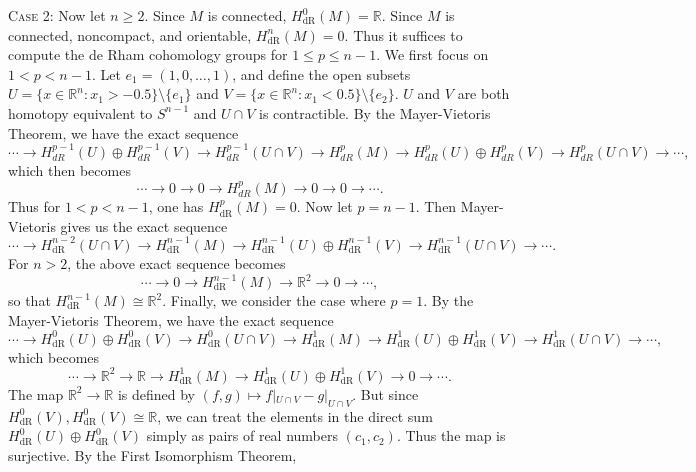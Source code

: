 \documentclass{article}
\begin{document}
	\textsc{Case 2:} Now let $n \geq 2$. Since $M$ is connected, $H^{0}_{\text{dR}}(M) = \mathbb{R}$. Since $M$ is connected, noncompact, and orientable, $H^{n}_{\text{dR}}(M) = 0$. Thus it suffices to compute the de Rham cohomology groups for $1 \leq p \leq n - 1$. We first focus on $1 < p < n - 1$. Let $e_{1} = (1,0, \ldots, 1)$, and define the open subsets $U = \{x \in \mathbb{R}^{n}: x_{1} > -0.5\} \setminus \{e_{1}\}$ and $V = \{x \in \mathbb{R}^{n}: x_{1} < 0.5\} \setminus \{e_{2}\}$. $U$ and $V$ are both homotopy equivalent to $S^{n-1}$ and $U \cap V$ is contractible. By the Mayer-Vietoris Theorem, we have the exact sequence 
	\begin{equation*}
		\dotsm \to H^{p-1}_{dR}(U) \oplus H^{p - 1}_{dR}(V) \to H^{p-1}_{dR}(U \cap V) \to H^{p}_{dR}(M) \to H^{p}_{dR}(U) \oplus H^{p}_{dR}(V) \to H^{p}_{dR}(U \cap V) \to \dotsm, 
	\end{equation*}
	which then becomes 
	\begin{equation*}
		\dotsm \to 0 \to 0 \to H^{p}_{dR}(M) \to 0 \to 0 \to \dotsm. 
	\end{equation*}
	Thus for $1 < p < n -1$, one has $H^{p}_{\text{dR}}(M) = 0$. Now let $p = n - 1$. Then Mayer-Vietoris gives us the exact sequence 
	\begin{equation*}
		\dotsm \to H^{n-2}_{\text{dR}}(U \cap V) \to H^{n-1}_{\text{dR}}(M) \to H^{n-1}_{\text{dR}}(U) \oplus H^{n-1}_{\text{dR}}(V) \to H^{n-1}_{\text{dR}}(U \cap V) \to \dotsm.  
	\end{equation*}
	For $n > 2$, the above exact sequence becomes 
	\begin{equation*}
		\dotsm \to 0 \to H^{n-1}_{\text{dR}}(M) \to\mathbb{R}^{2} \to 0 \to \dotsm, 
	\end{equation*}
	so that $H^{n-1}_{\text{dR}}(M) \cong \mathbb{R}^{2}$. Finally, we consider the case where $p = 1$. By the Mayer-Vietoris Theorem, we have the exact sequence 
	\begin{equation*}
		\dotsm \to H^{0}_{\text{dR}}(U) \oplus H^{0}_{\text{dR}}(V) \to H^{0}_{\text{dR}}(U \cap V) \to H^{1}_{\text{dR}}(M) \to H^{1}_{\text{dR}}(U) \oplus H^{1}_{\text{dR}}(V) \to H^{1}_{\text{dR}}(U \cap V) \to \dotsm, 
	\end{equation*}
	which becomes 
	\begin{equation*}
		\dotsm \to \mathbb{R}^{2} \to \mathbb{R} \to H^{1}_{\text{dR}}(M) \to H^{1}_{\text{dR}}(U) \oplus H^{1}_{\text{dR}}(V) \to 0 \to \dotsm. 
	\end{equation*}
	The map $\mathbb{R}^{2} \to \mathbb{R}$ is defined by $(f, g) \mapsto f|_{U \cap V} - g|_{U \cap V}$. But since $H^{0}_{\text{dR}}(V), H^{0}_{\text{dR}}(V) \cong \mathbb{R}$, we can treat the elements in the direct sum $H^{0}_{\text{dR}}(U) \oplus H^{0}_{\text{dR}}(V)$ simply as pairs of real numbers $(c_{1}, c_{2})$. Thus the map is surjective. By the First Isomorphism Theorem, 
\end{document}

